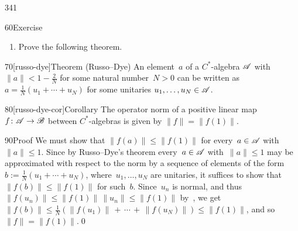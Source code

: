 \begin{parsec}{341}
\begin{point}{60}{Exercise}
\begin{enumerate}
\item
Prove the following theorem.
\end{enumerate}
\spacingfix%
\end{point}%
\begin{point}{70}[russo-dye]{Theorem (Russo--Dye)}%
An element~$a$ of a $C^*$-algebra $\mathscr{A}$
with $\|a\|< 1-\frac{2}{N}$
for some natural number~$N>0$
can be written as~$a=\frac{1}{N}(u_1+\dotsb + u_N)$
for some unitaries $u_1,\dotsc,u_N\in \mathscr{A}$.
\end{point}
\begin{point}{80}[russo-dye-cor]{Corollary}%
The operator norm of a positive
    linear map~$f\colon\mathscr{A}\to\mathscr{B}$ between
    $C^*$-algebras is given by  $\|f\|=\|f(1)\|$.
\begin{point}{90}{Proof}%
We must show that $\|f(a)\|\leq \|f(1)\|$
for every~$a\in\mathscr{A}$ with~$\|a\|\leq 1$.
Since by Russo--Dye's theorem 
every~$a\in\mathscr{A}$ with~$\|a\|\leq 1$ 
may be approximated with respect to the norm by a sequence
of elements of the form  $b:=\frac{1}{N}(u_1+\dotsb+u_N)$,
where~$u_1,\dotsc,u_N$ are unitaries,
it suffices to show that $\|f(b)\|\leq \|f(1)\|$
for such~$b$.
Since~$u_n$ is normal,
    and thus $\|f(u_n)\|\leq \|f(1)\|\,\|u_n\|\leq \|f(1)\|$
    by~,
    we get $\|f(b)\|\leq \frac{1}{N}(\|f(u_1)\|\,+\,\dotsb\,+\,\|f(u_N)\|)
    \leq \|f(1)\|$, and so $\|f\|=\|f(1)\|$.\qed
\end{point}
\end{point}
\end{parsec}

